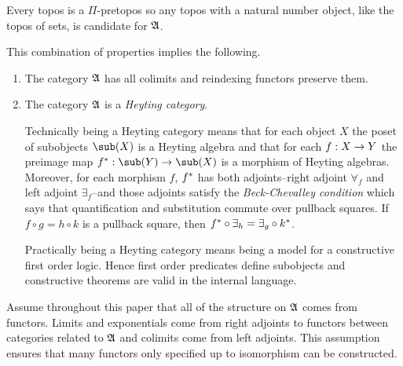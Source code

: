 \documentclass[csh.tex]{subfiles}
\begin{document}
\begin{example} Every topos is a $\Pi$-pretopos so any topos with a natural number object, like the topos of sets, is candidate for $\mathfrak A$. \end{example}

This combination of properties implies the following.
\begin{enumerate}
\item The category $\mathfrak A$ has all colimits and reindexing functors preserve them. 
\item The category $\mathfrak A$ is a \emph{Heyting category}. 

Technically being a Heyting category means that for each object $X$ the poset of subobjects $\sub(X)$ is a Heyting algebra and that for each $f: X\to Y$ the preimage map $f\ri\of\sub(Y)\to\sub(X)$ is a morphism of Heyting algebras. Moreover, for each morphism $f$, $f^*$ has both adjoints--right adjoint $\forall_f$ and left adjoint $\exists_f$--and those adjoints satisfy the \emph{Beck-Chevalley condition} which says that quantification and substitution commute over pullback squares. If $f\circ g = h\circ k$ is a pullback square, then $f^*\circ\exists_h=\exists_g\circ k^*$.

Practically being a Heyting category means being a model for a constructive first order logic. Hence first order predicates define subobjects and constructive theorems are valid in the internal language.
\end{enumerate}

\begin{remark} Assume throughout this paper that all of the structure on $\mathfrak A$ comes from functors. Limits and exponentials come from right adjoints to functors between categories related to $\mathfrak A$ and colimits come from left adjoints. This assumption ensures that many functors only specified up to isomorphism can be constructed.
\end{remark}
\end{document}
